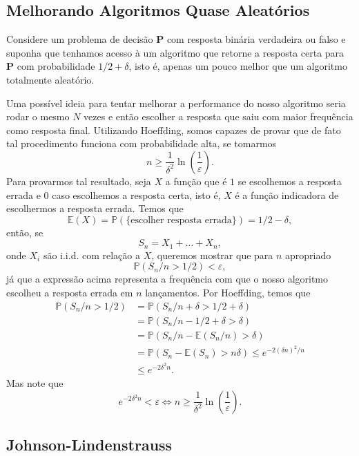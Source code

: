 \documentclass[12pt,a4paper,oneside]{book}
\theoremstyle{definition}
\theoremstyle{remark}
\numberwithin{equation}{section}
\newcommand{\e}{\varepsilon}
\newcommand{\E}{\mathbb{E}}
\newcommand{\pr}{\mathbb{P}}
\begin{document}
\subsection{Melhorando Algoritmos Quase Aleatórios} Considere um problema de decisão \textbf{P} com resposta binária verdadeira ou falso e suponha que tenhamos acesso à um algoritmo que retorne a resposta certa para \textbf{P} com probabilidade $1/2+\delta$, isto é, apenas um pouco melhor que um algoritmo totalmente aleatório. 

Uma possível ideia para tentar melhorar a performance do nosso algoritmo seria rodar o mesmo $N$ vezes e então escolher a resposta que saiu com maior frequência como resposta final. Utilizando Hoeffding, somos capazes de provar que de fato tal procedimento funciona com probabilidade alta, se tomarmos  
$$n\geq \dfrac{1}{\delta^2}\ln\left(\dfrac{1}{\e}\right).$$ 
Para provarmos tal resultado, seja $X$ a função que é $1$ se escolhemos a resposta errada e $0$ caso escolhemos a resposta certa, isto é, $X$ é a função indicadora de escolhermos a resposta errada. Temos que
$$\E(X)= \pr(\{\textrm{escolher resposta errada}\}) = 1/2-\delta,$$
então,  se $$ S_n = X_1+\dots+X_n, $$
onde $X_i$ são i.i.d. com relação a $X$, queremos mostrar que para $n$ apropriado
$$\pr(S_n/n>1/2)<\e, $$
já que a expressão acima representa a frequência com que o nosso algoritmo escolheu a resposta errada em  $n$ lançamentos. Por Hoeffding, temos que
\begin{align*}
\pr(S_n/n>1/2)& = \pr(S_n/n + \delta>1/2+\delta) \\
&= \pr(S_n/n -1/2+ \delta >\delta)\\
&= \pr(S_n/n -\E(S_n/n) >\delta)\\
&= \pr(S_n -\E(S_n) >n\delta)\leq e^{-2(\delta n)^2/n}\\
&\leq e^{-2\delta^2n}.
\end{align*}
Mas note que
$$e^{-2\delta^2n}<\e \Leftrightarrow n\geq \dfrac{1}{\delta^2}\ln\left(\dfrac{1}{\e}\right).  $$












\subsection{Johnson-Lindenstrauss }
\end{document}
